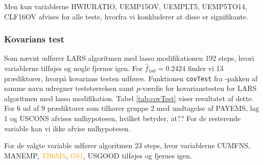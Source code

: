 Men kun variablerne \textcolor{blue3}{HWIURATIO}, \textcolor{blue3}{UEMP15OV}, \textcolor{blue3}{UEMPLT5}, \textcolor{blue3}{UEMP5TO14}, \textcolor{blue3}{CLF16OV} afvises for alle teste, hvorfra vi konkluderer at disse er signifikante.
\newpage
\subsubsection{Kovarians test}
Som nævnt udfører LARS algoritmen med lasso modifikationen 192 steps, hvori variablerne tilføjes og nogle fjernes igen.
For \(\widehat{f}_{1\text{sd}}=0.2424\) finder vi 13 prædiktorer, hvorpå kovarians testen udføres.
Funktionen \texttt{covTest} fra \Rlang-pakken af samme navn udregner teststørrelsen samt \(p\)-værdie for kovarianstesten for LARS algoritmen med lasso modifikation.
Tabel \ref{tab:covTest} viser resultatet af dette.
For 6 ud af 9 prædiktorer som tilhører gruppe 2 med undtagelse af \textcolor{blue3}{PAYEMS}, \textcolor{blue3}{lag 1} og \textcolor{blue3}{USCONS} afvises nulhypotesen, hvilket betyder, at??
For de resterende variable kan vi ikke afvise nulhypotesen.
%

%
For de valgte variable udfører algoritmen 23 steps, hvor variablerne  \textcolor{chartreuse4}{CUMFNS}, \textcolor{blue3}{MANEMP}, \textcolor{orange}{TB6MS}, \textcolor{orange}{GS1}, \textcolor{blue3}{USGOOD} tilføjes og fjernes igen.




%
